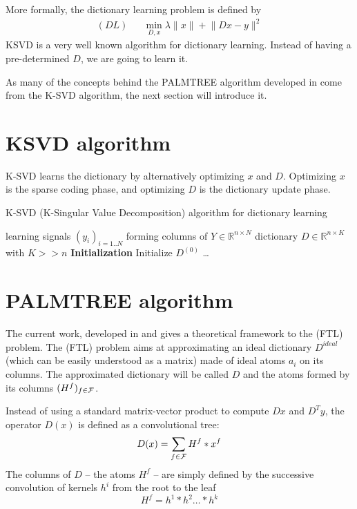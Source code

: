 More formally, the dictionary learning problem is defined by
\begin{equation*}
\begin{aligned}
(DL) && \underset{D,x}{\min} \lambda \lVert x \rVert + \lVert Dx-y \rVert^2
\end{aligned}
\end{equation*}
\ac{KSVD} is a very well known algorithm for dictionary learning. Instead of having a pre-determined $D$, we are going to learn it.

As many of the concepts behind the PALMTREE algorithm developed in \cite{chabiron_optimization_2016} come from the K-SVD algorithm, the next section will introduce it.


\section{\ac{KSVD} algorithm}


K-SVD learns the dictionary by alternatively optimizing $x$ and $D$. Optimizing $x$ is the sparse coding phase, and optimizing $D$ is the dictionary update phase.


\begin{algorithm} %
    \caption{K-SVD (K-Singular Value Decomposition) algorithm for dictionary learning}
  \begin{algorithmic}[1]
    \Input learning signals $(y_i)_{i=1..N}$ forming columns of $Y \in \mathbb{R}^{n \times N}$
    \Output dictionary $D \in \mathbb{R}^{n \times K}$ with $K>>n$
    \State \textbf{Initialization} Initialize $D^{(0)}$
	\State \dots
    \EndWhile
  \end{algorithmic}
\end{algorithm}


\section{PALMTREE algorithm}

The current work, developed in \cite{chabiron_toward_2015} and \cite{chabiron_optimization_2016} gives a theoretical framework to the (FTL) problem. The (FTL) problem aims at approximating an ideal dictionary $D^{ideal}$ (which can be easily understood as a matrix) made of ideal atoms $a_i$ on its columns. The approximated dictionary will be called $D$ and the atoms formed by its columns $(H^f)_{f \in \mathcal F}$. 

Instead of using a standard matrix-vector product to compute $Dx$ and $D^Ty$, the operator $D(x)$ is defined as a convolutional tree:
$$D(x) = \sum_{f\in\mathcal F} H^f * x^f$$
The columns of $D$ – the atoms $H^f$ – are simply defined by the successive convolution of kernels $h^i$ from the root to the leaf
$$H^f = h^1 * h^2 \dots * h^k$$

